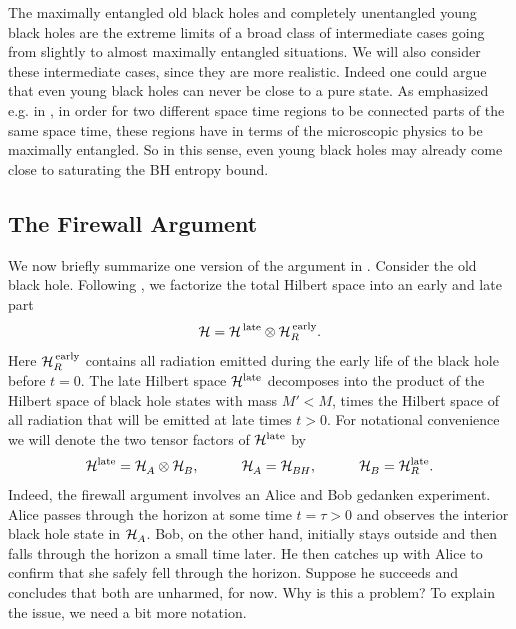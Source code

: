 \documentclass[12pt]{article}%
\def\be{\begin{equation}}
\def\ee{\end{equation}}
\begin{document}
The maximally entangled old black holes and completely unentangled young black holes are the extreme limits of a broad class of intermediate cases going from slightly to almost maximally entangled situations. We will also consider these intermediate cases, since they are more realistic.  Indeed one could argue that even young black holes
can never be close to a pure state. As emphasized e.g. in \cite{vanraamsdonk},  in order for two different space time regions to be connected parts of the same space time, these regions have in 
terms of the microscopic physics to be maximally entangled.  So in this sense, even young black holes may already come close to saturating the BH entropy bound.



\def\mn{{{}_{\raisebox{-.5pt}{\scriptsize $\mom \nom$}}}}
\def\nm{{{}_{\raisebox{-.5pt}{\scriptsize $\nom \mom$}}}}



\subsection{The Firewall Argument}

We now briefly summarize one version of the argument in \cite{amps}. Consider the old black hole.
Following \cite{amps}, we factorize the total Hilbert space into an early and late part  
\be
{\cal H} = {\cal H}^{\rm \, late} \otimes {\cal H}_R^{\rm \, early}.
\ee
Here ${\cal H}_R^{\rm \, early}$ contains all radiation emitted during the early life of the black hole before $t=0$. 
The late Hilbert space ${\cal H}^{\rm late}$ decomposes into the product of the
Hilbert space of black hole states with mass $M'<M$, times the Hilbert space of all radiation that will be emitted at late times $t>0$. 
For notational convenience we will denote the two tensor factors of ${\cal H}^{\rm late}$ by
\be
{\cal H}^{\rm late} = {\cal H}_\AA \otimes {\cal H}_\BB, \qquad \quad 
{\cal H}_\AA = {\cal H}_\BH,  \qquad \quad  {\cal H}_\BB = {\cal H}_R^{\rm late}.
\ee
Indeed, the firewall argument involves an Alice and Bob gedanken experiment. Alice passes through the horizon at some time $t=\tau >0$ and observes
the interior black hole state in ${\cal H}_\AA$.  Bob, on the other hand, initially stays outside and then falls through the horizon a small time later.
He then catches up with Alice to confirm that she safely fell through the horizon. 
Suppose he succeeds and concludes that both are unharmed, for now. Why is this a problem?
To explain the issue, we need a bit more notation. 
\end{document}
